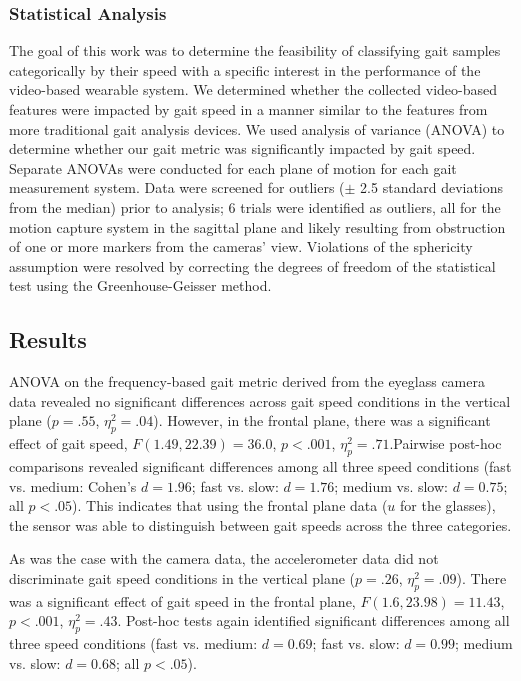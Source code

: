 \documentclass[12pt]{report}
\begin{document}
\subsubsection{Statistical Analysis}
The goal of this work was to determine the feasibility of classifying gait samples categorically by their speed with a specific interest in the performance of the video-based wearable system. We determined whether the collected video-based features were impacted by gait speed in a manner similar to the features from more traditional gait analysis devices. We used analysis of variance (ANOVA) to determine whether our gait metric was significantly impacted by gait speed. Separate ANOVAs were conducted for each plane of motion for each gait measurement system. Data were screened for outliers ($\pm$ 2.5 standard deviations from the median) prior to analysis; 6 trials were identified as outliers, all for the motion capture system in the sagittal plane and likely resulting from obstruction of one or more markers from the cameras' view. Violations of the sphericity assumption were resolved by correcting the degrees of freedom of the statistical test using the Greenhouse-Geisser method.

\subsection{Results}
ANOVA on the frequency-based gait metric derived from the eyeglass camera data revealed no significant differences across gait speed conditions in the vertical plane ($p= .55$, $\eta^2_p = .04$). However, in the frontal plane, there was a significant effect of gait speed, $F(1.49, 22.39) = 36.0$, $p < .001$, $\eta^2_p = .71$.Pairwise post-hoc comparisons revealed significant differences among all three speed conditions (fast vs. medium: Cohen's $d= 1.96$; fast vs. slow: $d= 1.76$; medium vs. slow: $d= 0.75$; all $p< .05$). This indicates that using the frontal plane data ($u$ for the glasses), the sensor was able to distinguish between gait speeds across the three categories. 
 
As was the case with the camera data, the accelerometer data did not discriminate gait speed conditions in the vertical plane ($p= .26$, $\eta^2_p = .09$). There was a significant effect of gait speed in the frontal plane, $F(1.6, 23.98) = 11.43$, $p < .001$, $\eta^2_p = .43$. Post-hoc tests again identified significant differences among all three speed conditions (fast vs. medium: $d = 0.69$; fast vs. slow: $d= 0.99$; medium vs. slow: $d= 0.68$; all $p < .05$).
 
\end{document}
